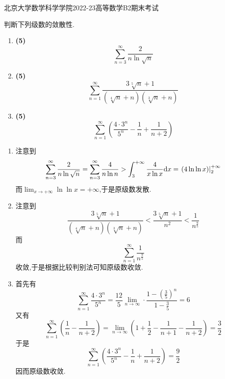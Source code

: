 \documentclass{ctexart}
\begin{document}
\pagestyle{empty}
\begin{center}\Large
    北京大学数学科学学院2022-23高等数学B2期末考试
\end{center}
\begin{problem}[1.(15\songti{分})]
    判断下列级数的敛散性.
    \begin{enumerate}[label=\tbf{(\arabic*)},topsep=0pt,parsep=0pt,itemsep=0pt,partopsep=0pt]
        \item \textbf{(5)}
            \[\sum_{n=3}^{\infty}\dfrac{2}{n\ln\sqrt{n}}\]
        \item \textbf{(5)}
            \[\sum_{n=1}^{\infty}\dfrac{3\sqrt[5]{n}+1}{\left(\sqrt[4]{n}+n\right)\left(\sqrt[3]{n}+n\right)}\]
        \item \textbf{(5)}
            \[\sum_{n=1}^{\infty}\left(\dfrac{4\cdot3^n}{5^n}-\dfrac{1}{n}+\dfrac{1}{n+2}\right)\]
    \end{enumerate}

\end{problem}
\begin{solution}
    \begin{enumerate}[label=\tbf{(\arabic*)},topsep=0pt,parsep=0pt,itemsep=0pt,partopsep=0pt]
        \item 注意到
            \[\sum_{n=3}^{\infty}\dfrac{2}{n\ln\sqrt{n}}
            =\sum_{n=3}^{\infty}\dfrac{4}{n\ln n}
            >\int_3^{+\infty}\dfrac{4}{x\ln x}\mathrm{d} x
            =\left.\left(4\ln\ln x\right)\right|_2^{+\infty}\]
            而$\displaystyle\lim_{x\to+\infty}\ln\ln x=+\infty$,于是原级数发散.
        \item 注意到
            \[\dfrac{3\sqrt[5]{n}+1}{\left(\sqrt[4]{n}+n\right)\left(\sqrt[3]{n}+n\right)}<\dfrac{3\sqrt[5]{n}+1}{n^2}<\dfrac{1}{n^{\frac{9}{5}}}\]
            而
            \[\sum_{n=1}^{\infty}\dfrac{1}{n^{\frac{9}{5}}}\]
            收敛,于是根据比较判别法可知原级数收敛.
        \item 首先有
            \[\sum_{n=1}^{\infty}\dfrac{4\cdot3^n}{5^n}=\dfrac{12}{5}\lim_{n\to\infty}\cdot\dfrac{1-\left(\frac35\right)^n}{1-\frac35}=6\]
            又有
            \[\sum_{n=1}^{\infty}\left(\dfrac{1}{n}-\dfrac{1}{n+2}\right)
            =\lim_{n\to\infty}\left(1+\dfrac{1}{2}-\dfrac{1}{n+1}-\dfrac{1}{n+2}\right)
            =\dfrac32\]
            于是
            \[\sum_{n=1}^{\infty}\left(\dfrac{4\cdot3^n}{5^n}-\dfrac{1}{n}+\dfrac{1}{n+2}\right)=\dfrac{9}{2}\]
            因而原级数收敛.
    \end{enumerate}
\end{solution}
\end{document}
